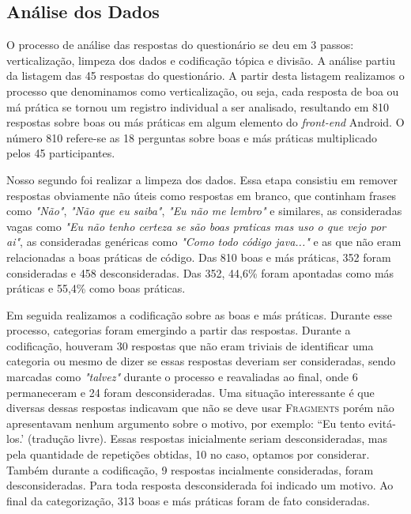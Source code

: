 \subsection{An\'alise dos Dados}
\label{sub:smells-definition}

O processo de análise das respostas do questionário se deu em 3 passos: verticaliza\c{c}\~ao, limpeza dos dados e codifica\c{c}\~ao t\'opica e divis\~ao. A an\'alise partiu da listagem das 45 respostas do question\'ario. A partir desta listagem realizamos o processo que denominamos como verticaliza\c{c}\~ao, ou seja, cada resposta de boa ou m\'a pr\'atica se tornou um registro individual a ser analisado, resultando em 810 respostas sobre boas ou m\'as pr\'aticas em algum elemento do \textit{front-end} Android. O n\'umero 810 refere-se as 18 perguntas sobre boas e m\'as pr\'aticas multiplicado pelos 45 participantes.

Nosso segundo foi realizar a limpeza dos dados. Essa etapa consistiu em remover respostas obviamente n\~ao \'uteis como respostas em branco, que continham frases como \textit{"N\~ao"}, \textit{"N\~ao que eu saiba"}, \textit{"Eu n\~ao me lembro"} e similares, as consideradas vagas como \textit{"Eu n\~ao tenho certeza se s\~ao boas praticas mas uso o que vejo por ai"}, as consideradas gen\'ericas como \textit{"Como todo c\'odigo java..."} e as que n\~ao eram relacionadas a boas pr\'aticas de c\'odigo. Das 810 boas e m\'as pr\'aticas, 352 foram consideradas e 458 desconsideradas. Das 352, 44,6\% foram apontadas como m\'as pr\'aticas e 55,4\% como boas pr\'aticas. 

Em seguida realizamos a codifica\c{c}\~ao sobre as boas e más práticas. Durante esse processo, categorias foram emergindo a partir das respostas. Durante a codifica\c{c}\~ao, houveram 30 respostas que n\~ao eram triviais de identificar uma categoria ou mesmo de dizer se essas respostas deveriam ser consideradas, sendo marcadas como \textit{"talvez"} durante o processo e reavaliadas ao final, onde 6 permaneceram e 24 foram desconsideradas. Uma situa\c{c}\~ao interessante \'e que diversas dessas respostas indicavam que n\~ao se deve usar \textsc{Fragments} por\'em n\~ao apresentavam nenhum argumento sobre o motivo, por exemplo: ``Eu tento evit\'a-los.' (tradu\c{c}\~ao livre). Essas respostas inicialmente seriam desconsideradas, mas pela quantidade de repeti\c{c}\~oes obtidas, 10 no caso, optamos por considerar. Tamb\'em durante a codifica\c{c}\~ao, 9 respostas incialmente consideradas, foram desconsideradas. Para toda resposta desconsiderada foi indicado um motivo. Ao final da categoriza\c{c}\~ao, 313 boas e m\'as pr\'aticas foram de fato consideradas.

